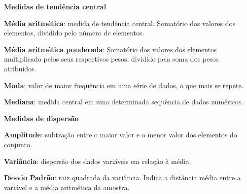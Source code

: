 \begin{multicols*}{2}
\textbf{Medidas de tendência central}

\textbf{Média aritmética}: medida de tendência central. Somatório dos valores dos elementos, dividido pelo número de elementos.

\textbf{Média aritmética ponderada}: Somatório dos valores dos elementos multiplicado pelos seus respectivos pesos, dividido pela soma dos pesos atribuídos.

\textbf{Moda}: valor de maior frequência em uma série de dados, o que mais se repete.

\textbf{Mediana}: medida central em uma determinada sequência de dados numéricos.

\textbf{Medidas de dispersão}

\textbf{Amplitude}: subtração entre o maior valor e o menor valor dos elementos do conjunto.

\textbf{Variância}: dispersão dos dados variáveis em relação à média.

\textbf{Desvio Padrão}: raiz quadrada da variância. Indica a distância média entre a variável e a média aritmética da amostra.


	
	
	
	
		



\end{multicols*}

